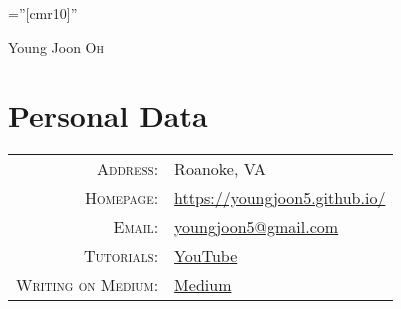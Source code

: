 \documentclass[a4paper,10pt]{article}
\begin{document}
 


\font\fb=''[cmr10]'' %

\par{\centering
		{\huge Young Joon \textsc{Oh}
	}\bigskip\par}


\section{Personal Data}

\begin{tabular}{rl}
    \textsc{Address:}   & Roanoke, VA\\
    \textsc{Homepage:}   & \href{https://youngjoon5.github.io/}{https://youngjoon5.github.io/}\\
    \textsc{Email:}      & \href{mailto:youngjoon5@gmail.com}{youngjoon5@gmail.com}\\
    \textsc{Tutorials:}   & \href{https://www.youtube.com/user/yjoon5}{YouTube}\\
     \textsc{Writing on Medium:}   & \href{https://medium.com/@youngjoonoh}{Medium}\\
\end{tabular}

\end{document}
